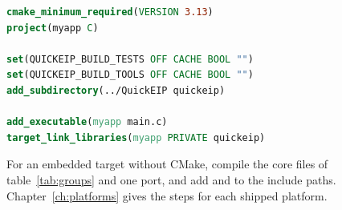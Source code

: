 \begin{lstlisting}[language=cmake]
cmake_minimum_required(VERSION 3.13)
project(myapp C)

set(QUICKEIP_BUILD_TESTS OFF CACHE BOOL "")
set(QUICKEIP_BUILD_TOOLS OFF CACHE BOOL "")
add_subdirectory(../QuickEIP quickeip)

add_executable(myapp main.c)
target_link_libraries(myapp PRIVATE quickeip)
\end{lstlisting}

For an embedded target without CMake, compile the core files of
table~\ref{tab:groups} and one port, and add  and 
to the include paths. Chapter~\ref{ch:platforms} gives the steps for each
shipped platform.
